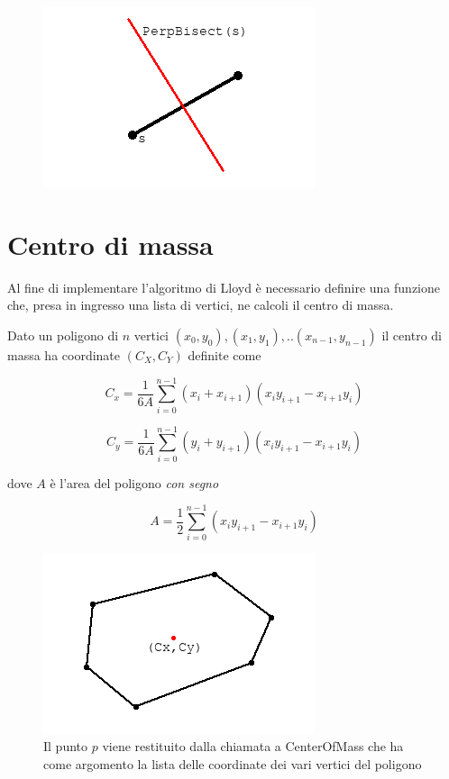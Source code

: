 \documentclass[11pt,a4paper]{report}
\newcommand{\modelicaclass}[1]{
	
}
\newcommand{\name}[1]{{\ttfamily #1}}
\begin{document}
\begin{figure}[H]
\centering
\includegraphics[scale=0.7]{PerpendicularBisector.png}
\end{figure}

\modelicaclass{PerpendicularBisector.mo}

\section{Centro di massa}

Al fine di implementare l'algoritmo di Lloyd è necessario definire una funzione che, presa in ingresso una lista di vertici, ne calcoli il centro di massa.

Dato un poligono di $n$ vertici $(x_0, y_0), (x_1, y_1), ..(x_{n-1},y_{n-1})$ il centro di massa ha coordinate $(C_X, C_Y)$ definite come

\[
C_x = \frac{1}{6 A} \sum_{i=0}^{n-1} (x_i + x_{i+1}) (x_i y_{i+1} - x_{i+1} y_i)
\]

\[
C_y = \frac{1}{6 A} \sum_{i=0}^{n-1} (y_i + y_{i+1}) (x_i y_{i+1} - x_{i+1} y_i)
\]

dove $A$ è l'area del poligono \textit{con segno}

\[
A = \frac{1}{2} \sum_{i=0}^{n-1} (x_i y_{i+1} - x_{i+1} y_i)
\]

\begin{figure}[H]
\centering
\includegraphics[scale=0.6]{CenterOfMass.png}
\caption{Il punto $p$ viene restituito dalla chiamata a \name{CenterOfMass} che ha come argomento la lista delle coordinate dei vari vertici del poligono}
\end{figure}
\end{document}
